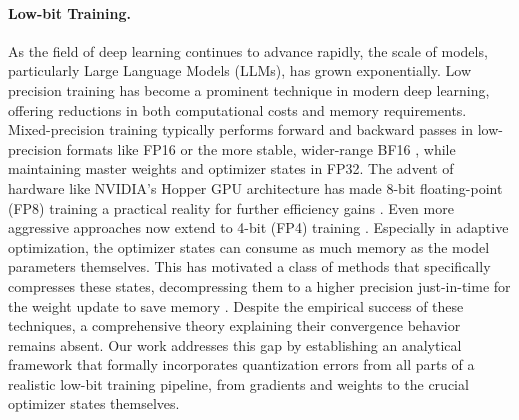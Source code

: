 \documentclass[11pt, letterpaper]{article}
\begin{document}
\paragraph{Low-bit Training.}
As the field of deep learning continues to advance rapidly, the scale of models, particularly Large Language Models (LLMs), has grown exponentially.  Low precision training \citep{wang2018trainingfp8,wortsman2023stable,liu2023llm,xi2024jetfire,liu2024deepseek} has become a prominent technique in modern deep learning, offering reductions in both computational costs and memory requirements. Mixed-precision training typically performs forward and backward passes in low-precision formats like FP16 \citep{micikevicius2017mixedprecision}  or the more stable, wider-range BF16 \citep{kalamkar2019bf16study}, while maintaining master weights and optimizer states in FP32. The advent of hardware like NVIDIA's Hopper GPU architecture \citep{nvidia2022h100} has made 8-bit floating-point (FP8) training a practical reality for further efficiency gains \citep{micikevicius2022fp8,peng2023fp8,xi2025coat,fishman2025scaling}. Even more aggressive approaches now extend to 4-bit (FP4) training \citep{wang2025optimizing,zhou2025efficientpretrainingexploringfp4}. Especially in adaptive optimization, the optimizer states can consume as much memory as the model parameters themselves. This has motivated a class of methods that specifically compresses these states, decompressing them to a higher precision just-in-time for the weight update to save memory \citep{dettmers2021adam8bit,peng2023fp8,li2024optimizer4bit,fishman2025scaling,xi2025coat}. Despite the empirical success of these techniques, a comprehensive theory explaining their convergence behavior remains absent. Our work addresses this gap by establishing an analytical framework that formally incorporates quantization errors from all parts of a realistic low-bit training pipeline, from gradients and weights to the crucial optimizer states themselves.
\end{document}
